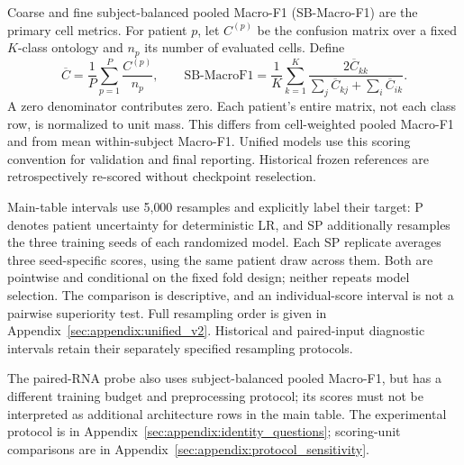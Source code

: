 Coarse and fine subject-balanced pooled Macro-F1 (SB-Macro-F1) are the primary
cell metrics. For patient $p$, let $C^{(p)}$ be the confusion matrix over a fixed
$K$-class ontology and $n_p$ its number of evaluated cells. Define
\begin{equation}
\overline C=\frac{1}{P}\sum_{p=1}^{P}\frac{C^{(p)}}{n_p},\qquad
\mathrm{SB\text{-}MacroF1}=\frac{1}{K}\sum_{k=1}^{K}
\frac{2\overline C_{kk}}{\sum_j\overline C_{kj}+\sum_i\overline C_{ik}}.
\label{eq:primary_sb_f1}
\end{equation}
A zero denominator contributes zero. Each patient's entire matrix, not each
class row, is normalized to unit mass. This differs from cell-weighted pooled
Macro-F1 and from mean within-subject Macro-F1. Unified models use this scoring
convention for validation and final reporting. Historical frozen references
are retrospectively re-scored without checkpoint reselection.

Main-table intervals use 5{,}000 resamples and explicitly label their target:
P denotes patient uncertainty for deterministic LR, and SP additionally
resamples the three training seeds of each randomized model. Each SP replicate averages three
seed-specific scores, using the same patient draw across them. Both are
pointwise and conditional on the fixed fold design; neither repeats model
selection. The comparison is descriptive, and an individual-score interval
is not a pairwise superiority test. Full resampling order is given in
Appendix~\ref{sec:appendix:unified_v2}. Historical and paired-input diagnostic
intervals retain their separately specified resampling protocols.

The paired-RNA probe also uses subject-balanced pooled Macro-F1, but has a
different training budget and preprocessing protocol; its scores must not be
interpreted as additional architecture rows in the main table.
The experimental protocol is in Appendix~\ref{sec:appendix:identity_questions};
scoring-unit comparisons are in Appendix~\ref{sec:appendix:protocol_sensitivity}.
